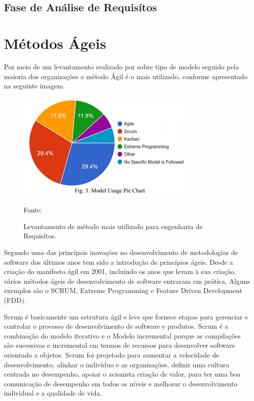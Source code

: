 \subsection{Fase de Análise de Requisítos}



\section{Métodos Ágeis}

Por meio de um levantamento realizado por \cite{riaz2018customization} sobre  tipo de modelo seguido pela maioria dos
organizações o método Ágil é o mais utilizado, conforme apresentado na seguinte imagem.

\begin{figure}[!htb]
\centering
\label{fig01}
\includegraphics[keepaspectratio=true,scale=0.6]{figuras/modelo_mais_usado.png}
\caption{Levantamento de método mais utilizado para engenharia de Requisítos.}
{Fonte: \cite{riaz2018customization}}
\end{figure}

Segundo \cite{vlaanderen2011agile} uma das principais inovações no desenvolvimento de
metodologias de software dos últimos anos tem sido a introdução
de princípios ágeis. Desde a criação do manifesto ágil
em 2001, incluindo os anos que levam à sua criação,
vários métodos ágeis de desenvolvimento de software entraram em prática. Alguns exemplos são o
SCRUM, Extreme Programming e Feature
Driven Development (FDD).

Scrum é basicamente um
estrutura ágil e leve que fornece etapas para gerenciar
e controlar o processo de desenvolvimento de software e produtos.
Scrum é a combinação do modelo iterativo e o
Modelo incremental porque as compilações são sucessivas e
incremental em termos de recursos para desenvolver software orientado a objetos. Scrum foi projetado para aumentar a velocidade de
desenvolvimento, alinhar o indivíduo e as organizações,
definir uma cultura centrada no desempenho, apoiar o acionista
criação de valor, para ter uma boa comunicação de desempenho em
todos os níveis e melhorar o desenvolvimento individual e a qualidade de vida. \cite{srivastava2017scrum}

